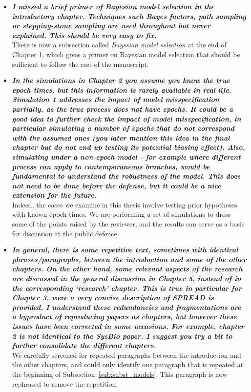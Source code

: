 \documentclass[english]{article}
\begin{document}
\begin{itemize}

\item {
{\it
\textbf{
I missed a brief primer of Bayesian model selection in the introductory chapter.
Techniques such Bayes factors, path sampling or stepping-stone sampling are used throughout but never explained. 
This should be very easy to fix.
}%
}%
}%
\\
There is now a subsection called \emph{Bayesian model selection} at the end of Chapter 1, which gives a primer on Bayesian model selection that should be sufficient to follow the rest of the manuscript.



\item {
{\it
\textbf{
In the simulations in Chapter 2 you assume you know the true epoch times, but this information is rarely available in real life. 
Simulation 1 addresses the impact of model misspecification partially, as the true process does not have epochs. 
It could be a good idea to further check the impact of model misspecification, in particular simulating a number of epochs that do not correspond with the assumed ones (you later mention this idea in the final chapter but do not end up testing its potential biasing effect). 
Also, simulating under a non-epoch model - for example where different process can apply to contemporaneous branches, would be fundamental to understand the robustness of the model. 
This does not need to be done before the defense, but it could be a nice extension for the future.
}%
}%
}%
\\
Indeed, the cases we examine in this thesis involve testing prior hypotheses with known epoch times.
We are performing a set of simulations to dress some of the points raised by the reviewer, and the results can serve as a basis for discussion at the public defence.


\item {
{\it
\textbf{
In general, there is some repetitive text, sometimes with identical phrases/paragraphs, between the introduction and some of the other chapters. 
On the other hand, some relevant aspects of the research are discussed in the general discussion in Chapter 5, instead of in the corresponding `research' chapter. 
This is true in particular for Chapter 3, were a very concise description of SPREAD is provided. 
I understand these redundancies and fragmentations are a byproduct of reproducing papers as chapters, but however these issues have been corrected in some occasions. 
For example, chapter 2 is not identical to the SysBio paper. 
I suggest you try a bit to further consolidate the different chapters.
}%
}%
}%
\\
We carefully screened for repeated paragraphs between the introduction and the other chapters, and could only identify one paragraph that is repeated at the beginning of Subsection~\ref{sub:subst_models}.
This paragraph is now rephrased to remove the repetition.


\end{itemize}
\end{document}
